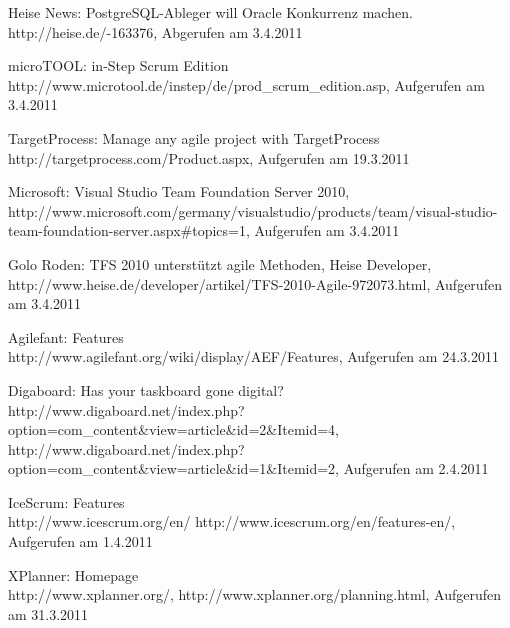 \documentclass[german,english]{header}
\begin{document}
\begin{thebibliography}{5}
Heise News:
PostgreSQL-Ableger will Oracle Konkurrenz machen.\\
http://heise.de/-163376, Abgerufen am 3.4.2011

microTOOL:
in-Step Scrum Edition
http://www.microtool.de/instep/de/prod\_scrum\_edition.asp,
Aufgerufen am 3.4.2011

TargetProcess: Manage any agile project with TargetProcess\\
http://targetprocess.com/Product.aspx,
Aufgerufen am 19.3.2011

Microsoft:
Visual Studio Team Foundation Server 2010,
http://www.microsoft.com/germany/visualstudio/products/team/visual-studio-team-foundation-server.aspx\#topics=1,
Aufgerufen am 3.4.2011

Golo Roden: 
TFS 2010 unterstützt agile Methoden, Heise Developer,
http://www.heise.de/developer/artikel/TFS-2010-Agile-972073.html,
Aufgerufen am 3.4.2011

Agilefant: Features\\ 
http://www.agilefant.org/wiki/display/AEF/Features,
Aufgerufen am 24.3.2011

Digaboard: Has your taskboard gone digital?
http://www.digaboard.net/index.php?option=com\_content\&view=article\&id=2\&Itemid=4,
http://www.digaboard.net/index.php?option=com\_content\&view=article\&id=1\&Itemid=2,
Aufgerufen am 2.4.2011

IceScrum: Features\\
http://www.icescrum.org/en/
http://www.icescrum.org/en/features-en/,
Aufgerufen am 1.4.2011

XPlanner: Homepage\\
http://www.xplanner.org/,
http://www.xplanner.org/planning.html,
Aufgerufen am 31.3.2011

\end{thebibliography}
\end{document}
